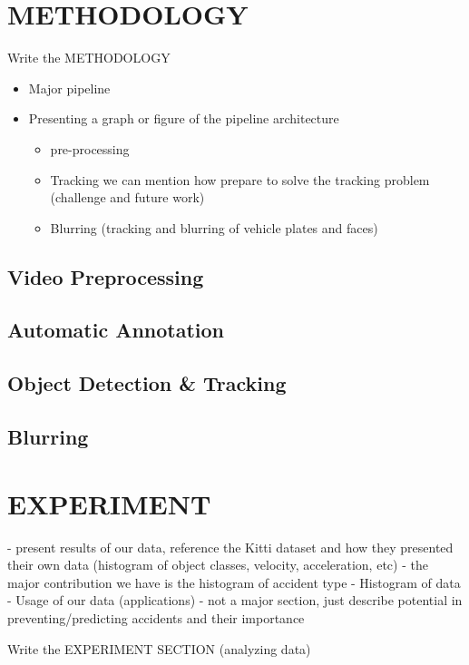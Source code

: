 \documentclass[letterpaper, 10 pt, conference]{IEEEconf}
\newcommand{\todo}[1]{{\color{red}#1}}
\begin{document}
\section{METHODOLOGY}

\todo{Write the METHODOLOGY}
\begin{itemize}
  \item Major pipeline
  \item Presenting a graph or figure of the pipeline architecture
  \begin{itemize}
    \item pre-processing
    \item Tracking we can mention how prepare to solve the tracking problem (challenge and future work)
    \item Blurring (tracking and blurring of vehicle plates and faces)
  \end{itemize}
\end{itemize}
\subsection{Video Preprocessing}
\subsection{Automatic Annotation}
\subsection{Object Detection \& Tracking}
\subsection{Blurring}


\section{EXPERIMENT}
- present results of our data, reference the Kitti dataset and how they presented their own data (histogram of object classes, velocity, acceleration, etc)
- the major contribution we have is the histogram of accident type
- Histogram of data
- Usage of our data (applications) - not a major section, just describe potential in preventing/predicting accidents and their importance


\todo{Write the EXPERIMENT SECTION (analyzing data)}
\end{document}
